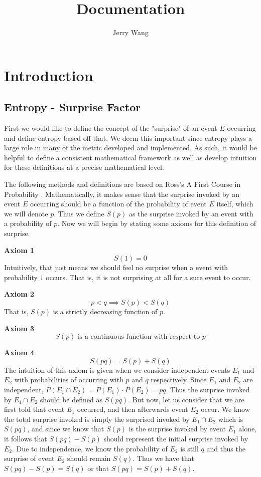 \documentclass{article}
\title{Documentation}
\author{Jerry Wang}
\date{ }
\begin{document}
\maketitle

\tableofcontents
\newpage
\section{Introduction}
\subsection{Entropy - Surprise Factor}
First we would like to define the concept of the "surprise" of an event $E$ occurring and define entropy based off that. We deem this important since entropy plays a large role in many of the metric developed and implemented. As such, it would be helpful to define a consistent mathematical framework as well as develop intuition for these definitions at a precise mathematical level. 

The following methods and definitions are based on Ross's A First Course in Probability \cite{b1}. Mathematically, it makes sense that the surprise invoked by an event $E$ occurring should be a function of the probability of event $E$ itself, which we will denote $p$.
Thus we define $S(p)$ as the surprise invoked by an event with a probability of $p$. 
Now we will begin by stating some axioms for this definition of surprise.

\textbf{Axiom 1}
\[S(1) = 0\]
Intuitively, that just means we should feel no surprise when a event with probability $1$ occurs. That is, it is not surprising at all for a sure event to occur.

\textbf{Axiom 2}
\[
p<q \implies S(p)<S(q)
\]
That is, $S(p)$ is a strictly decreasing function of $p$.

\textbf{Axiom 3}
\[
S(p) \text{ is a continuous function with respect to $p$}
\]

\textbf{Axiom 4}
\[
S(pq) =S(p)+S(q)
\]
The intuition of this axiom is given when we consider independent events $E_1$ and $E_2$ with probabilities of occurring with $p$ and $q$ respectively. 
Since $E_1$ and $E_2$ are independent, $P(E_1 \cap E_2) = P(E_1)\cdot P(E_2) = pq$. 
Thus the surprise invoked by $E_1 \cap E_2$ should be defined as $S(pq)$. 
But now, let us consider that we are first told that event $E_1$ occurred, and then afterwards event $E_2$ occur. 
We know the total surprise invoked is simply the surprised invoked by $E_1 \cap E_2$ which is $S(pq)$, and since we know that $S(p)$ is the surprise invoked by event $E_1$ alone, it follows that $S(pq) - S(p)$ should represent the initial surprise invoked by $E_2$. 
Due to independence, we know the probability of $E_2$ is still $q$ and thus the surprise of event $E_2$ should remain $S(q)$. 
Thus we have that $S(pq) - S(p) = S(q)$ or that $S(pq) =S(p)+S(q)$. 
\end{document}
